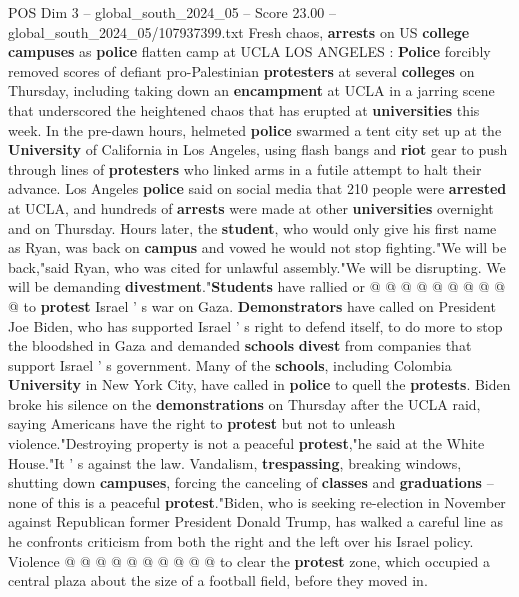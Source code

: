 \begin{textsample}{POS Dim 3 – global\_south\_2024\_05 – Score 23.00 – global\_south\_2024\_05/107937399.txt}  \label{ex:f3_pos_103}
Fresh chaos, \textbf{arrests} on US \textbf{college} \textbf{campuses} as \textbf{police} flatten camp at UCLA LOS ANGELES : \textbf{Police} forcibly removed scores of defiant pro-Palestinian \textbf{protesters} at several \textbf{colleges} on Thursday, including taking down an \textbf{encampment} at UCLA in a jarring scene that underscored the heightened chaos that has erupted at \textbf{universities} this week.
In the pre-dawn hours, helmeted \textbf{police} swarmed a tent city set up at the \textbf{University} of California in Los Angeles, using flash bangs and \textbf{riot} gear to push through lines of \textbf{protesters} who linked arms in a futile attempt to halt their advance.
Los Angeles \textbf{police} said on social media that 210 people were \textbf{arrested} at UCLA, and hundreds of \textbf{arrests} were made at other \textbf{universities} overnight and on Thursday.
Hours later, the \textbf{student}, who would only give his first name as Ryan, was back on \textbf{campus} and vowed he would not stop fighting."We will be back,"said Ryan, who was cited for unlawful assembly."We will be disrupting.
We will be demanding \textbf{divestment}."\textbf{Students} have rallied or @ @ @ @ @ @ @ @ @ @ to \textbf{protest} Israel ' s war on Gaza. \textbf{Demonstrators} have called on President Joe Biden, who has supported Israel ' s right to defend itself, to do more to stop the bloodshed in Gaza and demanded \textbf{schools} \textbf{divest} from companies that support Israel ' s government.
Many of the \textbf{schools}, including Colombia \textbf{University} in New York City, have called in \textbf{police} to quell the \textbf{protests}.
Biden broke his silence on the \textbf{demonstrations} on Thursday after the UCLA raid, saying Americans have the right to \textbf{protest} but not to unleash violence."Destroying property is not a peaceful \textbf{protest},"he said at the White House."It ' s against the law.
Vandalism, \textbf{trespassing}, breaking windows, shutting down \textbf{campuses}, forcing the canceling of \textbf{classes} and \textbf{graduations} -- none of this is a peaceful \textbf{protest}."Biden, who is seeking re-election in November against Republican former President Donald Trump, has walked a careful line as he confronts criticism from both the right and the left over his Israel policy.
Violence @ @ @ @ @ @ @ @ @ @ to clear the \textbf{protest} zone, which occupied a central plaza about the size of a football field, before they moved in.

\end{textsample}

